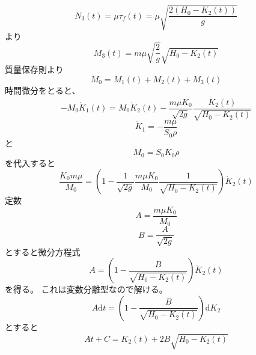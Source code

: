 \documentclass[]{article}
\begin{document}
\begin{equation} \label{250917175724} 
   N_3(t) = \mu \tau_f(t) = \mu \sqrt{\frac{2(H_0-K_2(t))}{g}} 
\end{equation}
より
\begin{equation} \label{250917175839} 
   M_3(t) = m \mu \sqrt{\frac{2}{g}} \sqrt{H_0-K_2(t)}
\end{equation}
質量保存則より
\begin{equation} \label{250917175922} 
   M_0 = M_1(t) + M_2(t) + M_3(t)
\end{equation}
時間微分をとると、
\begin{equation} \label{250917180035} 
   -M_0 \dot{K}_1(t) = M_0 \dot{K}_2(t)  - \frac{m\mu K_0}{\sqrt{2g}} \frac{\dot{K}_2(t)}{\sqrt{H_0-K_2(t)}}
\end{equation}
\begin{equation} \label{250917180138} 
   \dot{K}_1 = -\frac{m\mu}{S_0\rho}
\end{equation}
と
\begin{equation} \label{250917180220} 
   M_0 =  S_0 K_0 \rho
\end{equation}
を代入すると
\begin{equation} \label{250917180242} 
   \frac{K_0 m \mu}{M_0} =  \left(1 - \frac{1}{\sqrt{2g}}\frac{m \mu K_0}{M_0}  \frac{1}{\sqrt{H_0-K_2(t)}}\right) \dot{K}_2(t)
\end{equation}
定数
\begin{equation} \label{250917180407} 
   A = \frac{m \mu K_0}{M_0}
\end{equation}
\begin{equation} \label{250917180426} 
   B  = \frac{A}{\sqrt{2g}}
\end{equation}
とすると微分方程式
\begin{equation} \label{250917180438} 
   A = \left(1 -   \frac{B}{\sqrt{H_0-K_2(t)}}\right) \dot{K}_2(t)
\end{equation}
を得る。
これは変数分離型なので解ける。
\begin{equation} \label{250917180856} 
   A  \mathrm{d}t =  \left(1 -   \frac{B}{\sqrt{H_0-K_2(t)}}\right) \mathrm{d} K_2
\end{equation}
とすると
\begin{equation} \label{250917181005} 
   A t + C =  K_2(t) + 2B\sqrt{H_0-K_2(t)}
\end{equation}
\end{document}
